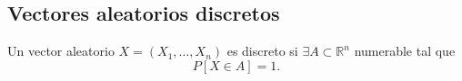 \begin{comment}
Cuando nos preguntamos si es el único, tenemos el siguiente resultado.
\begin{prop}
    Sea $X$ un vector aleatorio, y sea $A\subset \mathbb{R}^n$. Entonces:
    \begin{equation*}
        P[X\in A] = 1 \iff A = E_X.
    \end{equation*}
\end{prop}
\begin{proof} Demostramos mediante doble implicación.
    \begin{itemize}
        \item[$\Longleftarrow$)] Supongamos que $A = E_X$. Veamos ahora que $P[X\in E_X] = 1$. Tenemos que:
        \begin{equation*}
            P[X\in E_X] = P[X^{-1}(E_X)] = P[\Omega] = 1.
        \end{equation*}

        \item[$\Longrightarrow$)] Supongamos que $P[X\in A] = 1$. Demostramos que $A = E_X$ por doble inclusión.
        \begin{description}
            \item[$\subset$)] Tenemos que:
            \begin{equation*}
                P[X\in A] = P[X^{-1}(A)] = 1 \Longrightarrow X^{-1}(A) = \Omega
            \end{equation*}
            Tomando la imagen de $X$, tenemos que $A=X(\Omega) = E_X$.
            
            \item[$\supset$)] Como $P[X\in E_X]\leq 1$ por definición y, al ser una probabilidad, es una función creciente, tenemos que $E_X\subset A$.
        \end{description}
    \end{itemize}
\end{proof}
\end{comment}


\subsection{Vectores aleatorios discretos}
\begin{definicion}
    Un vector aleatorio $X=(X_1, \ldots, X_n)$ es discreto si $\exists A\subset \mathbb{R}^n$ numerable tal que
    \begin{equation*}
        P[X\in A] = 1.
    \end{equation*}
\end{definicion}


